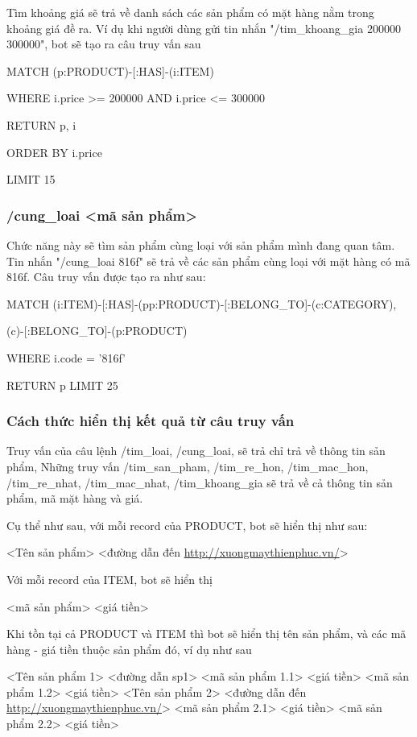 Tìm khoảng giá sẽ trả về danh sách các sản phẩm có mặt hàng nằm trong khoảng giá đề ra. Ví dụ khi người dùng gửi tin nhắn "/tim\_khoang\_gia 200000 300000", bot sẽ tạo ra câu truy vấn sau 

MATCH (p:PRODUCT)-[:HAS]-(i:ITEM)  

WHERE i.price >= 200000 AND i.price <= 300000 

RETURN p, i 

ORDER BY i.price  

LIMIT 15

\subsubsection{/cung\_loai <mã sản phẩm>}

Chức năng này sẽ tìm sản phẩm cùng loại với sản phẩm mình đang quan tâm. Tin nhắn "/cung\_loai 816f" sẽ trả về các sản phẩm cùng loại với mặt hàng có mã 816f. Câu truy vấn được tạo ra như sau: 

MATCH (i:ITEM)-[:HAS]-(pp:PRODUCT)-[:BELONG\_TO]-(c:CATEGORY),

(c)-[:BELONG\_TO]-(p:PRODUCT)  

WHERE i.code = '816f'

RETURN p LIMIT 25



\subsubsection{Cách thức hiển thị kết quả từ câu truy vấn}

Truy vấn của câu lệnh /tim\_loai, /cung\_loai, sẽ trả chỉ trả về thông tin sản phẩm, Những truy vấn /tim\_san\_pham, /tim\_re\_hon, /tim\_mac\_hon, /tim\_re\_nhat, /tim\_mac\_nhat, /tim\_khoang\_gia sẽ trả về cả thông tin sản phẩm, mã mặt hàng và giá. 

Cụ thể như sau, với mỗi record của PRODUCT, bot sẽ hiển thị như sau: 

<Tên sản phẩm> <đường dẫn đến \url{http://xuongmaythienphuc.vn/}> 

\smallskip

Với mỗi record của ITEM, bot sẽ hiển thị 

<mã sản phẩm> <giá tiền> 

\smallskip 

Khi tồn tại cả PRODUCT và ITEM thì bot sẽ hiển thị tên sản phẩm, và các mã hàng - giá tiền thuộc sản phẩm đó, ví dụ như sau 

<Tên sản phẩm 1> <đường dẫn sp1> 
<mã sản phẩm 1.1> <giá tiền> 
<mã sản phẩm 1.2> <giá tiền> 
<Tên sản phẩm 2> <đường dẫn đến \url{http://xuongmaythienphuc.vn/}> 
<mã sản phẩm 2.1> <giá tiền> 
<mã sản phẩm 2.2> <giá tiền> 



